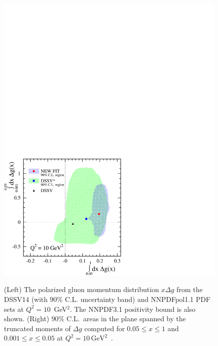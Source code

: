 \begin{figure}[!t]
\includegraphics[scale=0.555,clip=true,trim=0 0 7cm 15cm]{plots/correlation_getot.pdf}\\
\caption{\small (Left) The polarized gluon momentum distribution  
$x\Delta g$ from the DSSV14 (with $90\%$ C.L. uncertainty band)
and NNPDFpol1.1 PDF sets at $Q^2=10$~GeV$^2$. The NNPDF3.1 positivity
bound is also shown.
(Right) $90\%$ C.L.\ areas in the plane spanned by the truncated moments of
$\Delta g$ computed for $0.05\leq x\leq 1$ and $0.001\leq x\leq 0.05$ at $Q^2=10\,\mathrm{GeV}^2$~\cite{deFlorian:2014yva}.}
\label{fig:RHICpdfs}
\end{figure}

